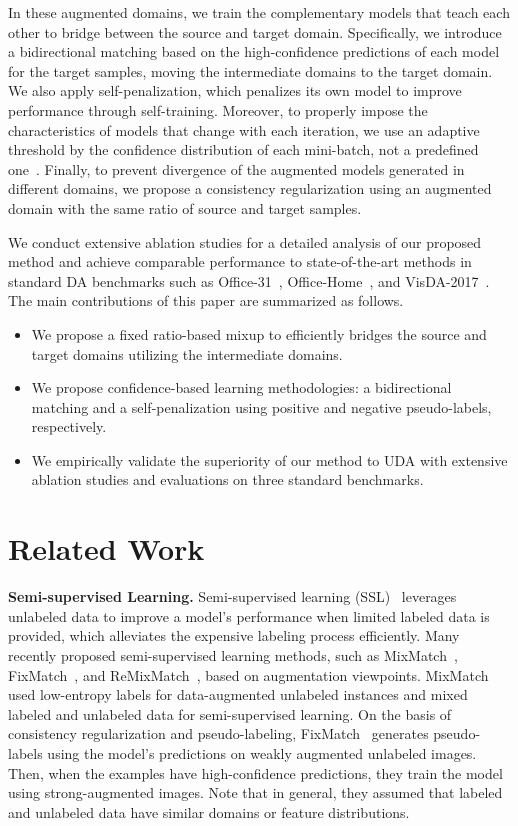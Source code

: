 \documentclass[final]{cvpr}
\begin{document}
In these augmented domains, we train the complementary models that teach each other to bridge between the source and target domain. Specifically, we introduce a bidirectional matching based on the high-confidence predictions of each model for the target samples, moving the intermediate domains to the target domain. We also apply self-penalization, which penalizes its own model to improve performance through self-training. Moreover, to properly impose the characteristics of models that change with each iteration, we use an adaptive threshold by the confidence distribution of each mini-batch, not a predefined one~\cite{Co-teaching, MiCo2020}. Finally, to prevent divergence of the augmented models generated in different domains, we propose a consistency regularization using an augmented domain with the same ratio of source and target samples.

We conduct extensive ablation studies for a detailed analysis of our proposed method and achieve comparable performance to state-of-the-art methods in standard DA benchmarks such as Office-31~\cite{Office-31}, Office-Home~\cite{Office-HOME}, and VisDA-2017~\cite{VisDA2017}. The main contributions of this paper are summarized as follows.
\begin{itemize}
    \item We propose a fixed ratio-based mixup to efficiently bridges the source and target domains utilizing the intermediate domains.
\item We propose confidence-based learning methodologies: a bidirectional matching and a self-penalization using positive and negative pseudo-labels, respectively.
\item We empirically validate the superiority of our method to UDA with extensive ablation studies and evaluations on three standard benchmarks.
\end{itemize}




\section{Related Work}
\textbf{Semi-supervised Learning.} Semi-supervised learning (SSL)~\cite{ReMixMatch, MixMatch, DLEE2013, Consistency2016, S4L, FixMatch, NS3L} leverages unlabeled data to improve a model’s performance when limited labeled data is provided, which alleviates the expensive labeling process efficiently. Many recently proposed semi-supervised learning methods, such as MixMatch~\cite{MixMatch}, FixMatch~\cite{FixMatch}, and ReMixMatch~\cite{ReMixMatch}, based on augmentation viewpoints. MixMatch~\cite{MixMatch} used low-entropy labels for data-augmented unlabeled instances and mixed labeled and unlabeled data for semi-supervised learning. 
On the basis of consistency regularization and pseudo-labeling, FixMatch~\cite{FixMatch} generates pseudo-labels using the model’s predictions on weakly augmented unlabeled images. Then, when the examples have high-confidence predictions, they train the model using strong-augmented images. Note that in general, they assumed that labeled and unlabeled data have similar domains or feature distributions. 
\end{document}
